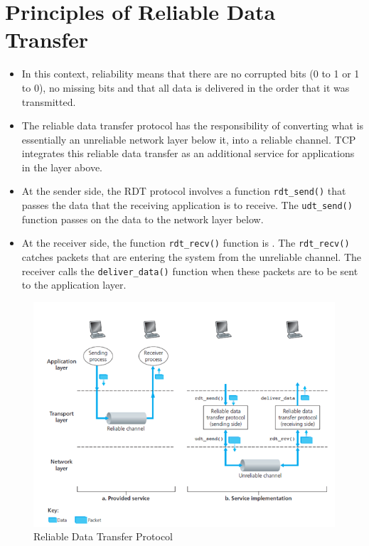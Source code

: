\documentclass{article}
\theoremstyle{plain}
\theoremstyle{definition}
\begin{document}
\section{Principles of Reliable Data Transfer}
\begin{itemize}
    \item In this context, reliability means that there are no corrupted bits (0 to 1 or 1 to 0), no missing bits and that all data is delivered in the order that it was transmitted. 
    
    \item The reliable data transfer protocol has the responsibility of converting what is essentially an unreliable network layer below it, into a reliable channel. TCP integrates this reliable data transfer as an additional service for applications in the layer above. 
    
    \item At the sender side, the RDT protocol involves a function \texttt{rdt\_send()} that passes the data that the receiving application is to receive. The \texttt{udt\_send()} function passes on the data to the network layer below. 
    
    \item At the receiver side, the function \texttt{rdt\_recv()} function is . The \texttt{rdt\_recv()} catches packets that are entering the system from the unreliable channel. The receiver calls the \texttt{deliver\_data()} function when these packets are to be sent to the application layer.
    
\end{itemize}

\begin{figure}[!h]
    \centering
    \includegraphics[scale=0.8]{cn2.png}
    \caption{Reliable Data Transfer Protocol}
    \label{fig:my_label_2}
\end{figure}
\end{document}
